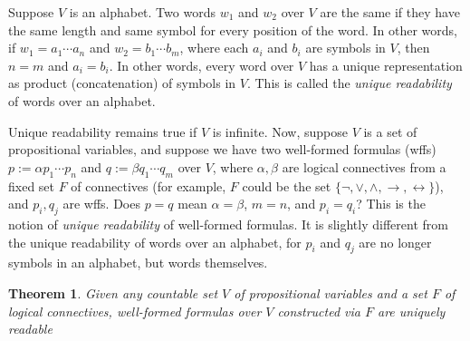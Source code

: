 \documentclass[12pt]{article}
\newtheorem{thm}{Theorem}
\begin{document}
Suppose $V$ is an alphabet.  Two words $w_1$ and $w_2$ over $V$ are the same if they have the same length and same symbol for every position of the word.  In other words, if $w_1 = a_1\cdots a_n$ and $w_2 = b_1\cdots b_m$, where each $a_i$ and $b_i$ are symbols in $V$, then $n=m$ and $a_i=b_i$.  In other words, every word over $V$ has a unique representation as product (concatenation) of symbols in $V$.  This is called the \emph{unique readability} of words over an alphabet.

Unique readability remains true if $V$ is infinite.  Now, suppose $V$ is a set of propositional variables, and suppose we have two well-formed formulas (wffs) $p:=\alpha p_1 \cdots p_n$ and $q:=\beta q_1 \cdots q_m$ over $V$, where $\alpha, \beta$ are logical connectives from a fixed set $F$ of connectives (for example, $F$ could be the set $\lbrace \neg, \vee, \wedge, \to, \leftrightarrow \rbrace$), and $p_i,q_j$ are wffs.  Does $p=q$ mean $\alpha = \beta$, $m=n$, and $p_i=q_i$?  This is the notion of \emph{unique readability} of well-formed formulas.  It is slightly different from the unique readability of words over an alphabet, for $p_i$ and $q_j$ are no longer symbols in an alphabet, but words themselves.

\begin{thm} Given any countable set $V$ of propositional variables and a set $F$ of logical connectives, well-formed formulas over $V$ constructed via $F$ are uniquely readable \end{thm}
\end{document}
